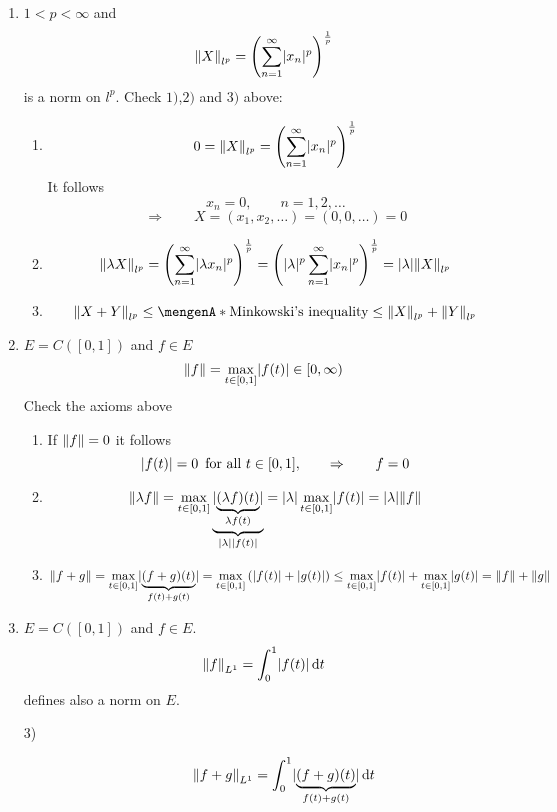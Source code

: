 \begin{beispiele}
	\begin{enumerate}[(1)]
		\item $1 < p < \infty$ and 
	\[
		\norm{X}_{l^p} = \left( \sum_{n=1}^{\infty} \abs{x_n}^p \right)^{\frac{1}{p}}
	\]
	is a norm on $l^p$. Check $1)$,$2)$ and $3)$ above:
	\begin{enumerate}[1)]
		\item \phantom{1} \[
			0 = \norm{X}_{l^p} = \left( \sum_{n=1}^{\infty} \abs{x_n}^p \right)^{\frac{1}{p}} 
		\]
		It follows
		\[
			x_n=0, \qquad n=1,2,\dots
		\]
		\[
			\Rightarrow \qquad X = (x_1,x_2, \dots) = (0,0,\dots) = 0
		\]
		\item \phantom{1}\[
			\norm{\lambda X}_{l^p} = \left( \sum_{n=1}^{\infty} \abs{\lambda x_n}^p \right)^{\frac{1}{p}} 
			= \left( \abs{\lambda}^p \sum_{n=1}^{\infty} \abs{x_n}^p \right)^{\frac{1}{p}} = \abs{\lambda} \norm{X}_{l^p}
		\]
		\item \phantom{1}\[
			\norm{X+Y}_{l^p} \leq \set{\text{Minkowski's inequality}} \leq \norm{X}_{l^p} + \norm{Y}_{l^p}
		\]
	\end{enumerate}
	\item $E = C([0,1])$ and $f \in E$
	\[
		\norm{f} = \max\limits_{t \in [0,1]} \abs{f(t)} \in [0,\infty)
	\]
	Check the axioms above
	\begin{enumerate}[1)]
		\item If $\norm{f} = 0$ it follows
		\[
			\lvert f(t)\rvert = 0 \,\text{ for all }t \in [0,1], \qquad \Rightarrow \qquad f=0
		\]
		\item \[
			\norm{\lambda f} = \max\limits_{t \in [0,1]} \underset{\abs{\lambda}\abs{f(t)}}{\underbrace{\abs{\underset{\lambda f(t)}{\underbrace{(\lambda f)(t)}}}}}
			= \abs{\lambda} \max\limits_{t \in [0,1]} \abs{f(t)} = \abs{\lambda} \norm{f}
		\]
		\item 
		\[
			\norm{f+g} = \max\limits_{t \in [0,1]} \abs{\underset{f(t)+g(t)}{\underbrace{(f+g)(t)}}} = \max\limits_{t \in [0,1]}  \left( \abs{f(t)} + \abs{g(t)} \right)
			\leq \max\limits_{t \in [0,1]} \abs{f(t)} + \max\limits_{t \in [0,1]} \abs{g(t)} = \norm{f} + \norm{g}
		\]
	\end{enumerate}
	\item $E = C([0,1])$ and $f \in E$.
	\[
		\norm{f}_{L^1} = \int_{0}^{1} \abs{f(t)} \,\mathrm{d}t 
	\]
	defines also a norm on $E$.
	\begin{description}
		\item[3)]
		\begin{align*}
			\norm{f+g}_{L^1} &= \int_{0}^{1} \abs{\underset{f(t)+g(t)}{\underbrace{(f+g)(t)}}} \,\mathrm{d}t \\

\end{align*}
\end{description}
\end{enumerate}
\end{beispiele}
